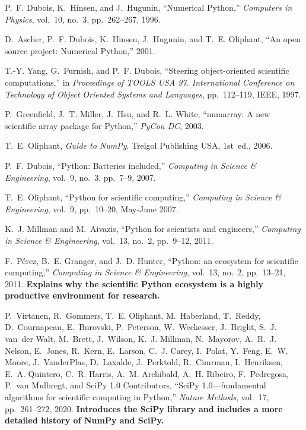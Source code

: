 \documentclass[twocolumn]{article}
\begin{document}
\begin{thebibliography}{10}

P.~F. Dubois, K.~Hinsen, and J.~Hugunin, ``Numerical {P}ython,'' {\em Computers
  in Physics}, vol.~10, no.~3, pp.~262--267, 1996.

D.~Ascher, P.~F. Dubois, K.~Hinsen, J.~Hugunin, and T.~E. Oliphant, ``An open
  source project: Numerical {P}ython,'' 2001.

T.-Y. Yang, G.~Furnish, and P.~F. Dubois, ``Steering object-oriented scientific
  computations,'' in {\em Proceedings of TOOLS USA 97. International Conference
  on Technology of Object Oriented Systems and Languages}, pp.~112--119, IEEE,
  1997.

P.~Greenfield, J.~T. Miller, J.~Hsu, and R.~L. White, ``numarray: A new
  scientific array package for {Python},'' {\em PyCon DC}, 2003.

T.~E. Oliphant, {\em Guide to {NumPy}}.
\newblock Trelgol Publishing USA, 1st~ed., 2006.

P.~F. Dubois, ``{P}ython: Batteries included,'' {\em Computing in Science \&
  Engineering}, vol.~9, no.~3, pp.~7--9, 2007.

T.~E. Oliphant, ``{P}ython for scientific computing,'' {\em Computing in
  Science \& Engineering}, vol.~9, pp.~10--20, May-June 2007.

K.~J. Millman and M.~Aivazis, ``{P}ython for scientists and engineers,'' {\em
  Computing in Science \& Engineering}, vol.~13, no.~2, pp.~9--12, 2011.

F.~P\'{e}rez, B.~E. Granger, and J.~D. Hunter, ``{P}ython: an ecosystem for
  scientific computing,'' {\em Computing in Science \& Engineering}, vol.~13,
  no.~2, pp.~13--21, 2011.
\newblock \newline \textbf{Explains why the scientific Python ecosystem is a
  highly productive environment for research.}

P.~Virtanen, R.~Gommers, T.~E. Oliphant, M.~Haberland, T.~Reddy, D.~Cournapeau,
  E.~Burovski, P.~Peterson, W.~Weckesser, J.~Bright, S.~J. van~der Walt,
  M.~Brett, J.~Wilson, K.~J. Millman, N.~Mayorov, A.~R.~J. Nelson, E.~Jones,
  R.~Kern, E.~Larson, C.~J. Carey, I.~Polat, Y.~Feng, E.~W. Moore,
  J.~VanderPlas, D.~Laxalde, J.~Perktold, R.~Cimrman, I.~Henriksen, E.~A.
  Quintero, C.~R. Harris, A.~M. Archibald, A.~H. Ribeiro, F.~Pedregosa, P.~van
  Mulbregt, and {SciPy 1.0 Contributors}, ``{SciPy} 1.0---fundamental
  algorithms for scientific computing in {Python},'' {\em Nature Methods},
  vol.~17, pp.~261--272, 2020.
\newblock \newline \textbf{Introduces the SciPy library and includes a more
  detailed history of NumPy and SciPy.}


\end{thebibliography}
\end{document}
